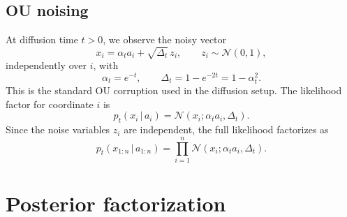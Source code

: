 \documentclass[11pt]{article}
\newcommand{\N}{\mathcal{N}}
\newcommand{\given}{\,|\,}
\begin{document}
\subsection{OU noising}

At diffusion time \(t>0\), we observe the noisy vector
\begin{equation}
  x_i = \alpha_t a_i + \sqrt{\Delta_t}\,z_i,
  \qquad z_i\sim \N(0,1),
\end{equation}
independently over \(i\), with
\begin{equation}
  \alpha_t=e^{-t},
  \qquad
  \Delta_t=1-e^{-2t}=1-\alpha_t^2.
\end{equation}
This is the standard OU corruption used in the diffusion setup. The likelihood factor for coordinate \(i\) is
\begin{equation}
  p_t(x_i\given a_i)=\N(x_i;\alpha_t a_i,\Delta_t).
\end{equation}
Since the noise variables \(z_i\) are independent, the full likelihood factorizes as
\begin{equation}
  p_t(x_{1:n}\given a_{1:n})
  =\prod_{i=1}^n \N(x_i;\alpha_t a_i,\Delta_t).
\end{equation}

\section{Posterior factorization}
\end{document}
